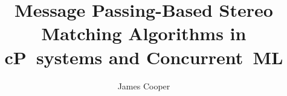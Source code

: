 \documentclass[11pt,partial,draft,doublespace]{aucklandthesis}
\begin{document}
\newcommand{\fsharp}{F\nolinebreak\hspace{-.05em}\raisebox{.3ex}{\tiny{\textbf{\#}}}}
\newcommand{\cps}{cP~systems}

%
%
%

\title{Message Passing-Based Stereo Matching Algorithms in cP~systems and Concurrent~ML}
\author{James Cooper}

\maketitle




\cleardoublepage\tableofcontents

% 

%
%
%
%








% 
% 
\end{document}
